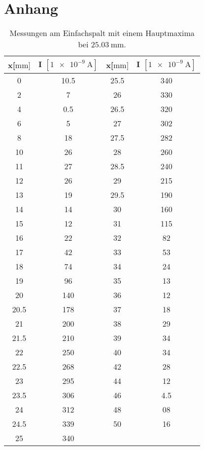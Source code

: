 \section{Anhang}

\begin{table}
    \centering
    \caption{Messungen am Einfachspalt mit einem Hauptmaxima bei $\SI{25.03}{\mm}$.}
    \label{tab:einfach}
    \begin{tabular}{c c || c c}
        \toprule
        x[$\si{\mm}]$   & I $[\SI{1e-9}{\ampere}]$ &  x[$\si{\mm}]$  & I $[\SI{1e-9}{\ampere}]$\\
        \midrule
        0        &     10.5 & 25.5     &     340  \\                                   
        2        &     7   & 26       &     330  \\    
        4        &     0.5 & 26.5     &     320  \\  
        6        &     5   & 27       &     302  \\
        8        &     18   & 27.5     &     282  \\
        10       &     26   & 28       &     260  \\
        11       &     27   & 28.5     &     240  \\
        12       &     26   & 29       &     215  \\
        13       &     19   & 29.5     &     190  \\
        14       &     14   & 30       &     160  \\
        15       &     12   & 31       &     115  \\
        16       &     22   & 32       &     82   \\
        17       &     42   & 33       &     53   \\
        18       &     74   & 34       &     24   \\
        19       &     96   & 35       &     13   \\
        20       &     140  & 36       &     12   \\ 
        20.5     &     178  & 37       &     18   \\     
        21       &     200  & 38       &     29   \\ 
        21.5     &     210  & 39       &     34   \\     
        22       &     250  & 40       &     34   \\  
        22.5     &     268  & 42       &     28   \\     
        23       &     295  & 44       &     12   \\ 
        23.5     &     306  & 46       &     4.5 \\     
        24       &     312  & 48       &     08   \\ 
        24.5     &     339  & 50       &     16   \\     
        25       &     340  & ~ &~ \\
        \bottomrule
    \end{tabular}
\end{table}




